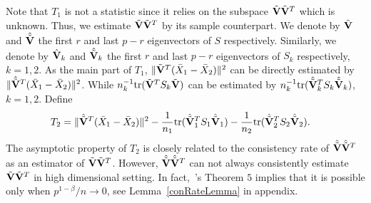 \documentclass[review]{elsarticle}
\theoremstyle{plain}
\theoremstyle{definition}
\newtheorem{remark}{\quad\quad Remark}
\theoremstyle{remark}
\begin{document}


Note that $T_1$ is not a statistic since it relies on the subspace $\tilde{\mathbf{V}}\tilde{\mathbf{V}}^T$ which is unknown. Thus, we estimate $\tilde{\mathbf{V}}\tilde{\mathbf{V}}^T$ by its sample counterpart.
We denote by $\hat{\mathbf{V}}$ and $\hat{\tilde{\mathbf{V}}}$ the first $r$ and last $p-r$ eigenvectors of $S$ respectively.
Similarly, we denote by  $\hat{\mathbf{V}}_k$ and $\hat{\tilde{\mathbf{V}}}_k$ the first $r$ and last $p-r$ eigenvectors of $S_k$ respectively, $k=1,2$.
As the main part of $T_1$, $\|\tilde{\mathbf{V}}^T (\bar{X}_1-\bar{X}_2)\|^2$
 can be directly estimated by $\|\hat{\tilde{\mathbf{V}}}^T (\bar{X}_1-\bar{X}_2)\|^2$.
While ${n_k^{-1}}\mathrm{tr}(\tilde{\mathbf{V}}^T S_k\tilde{\mathbf{V}})$ can be estimated by ${n_k^{-1}}\mathrm{tr}(\hat{\tilde{\mathbf{V}}}_k^T S_k\hat{\tilde{\mathbf{V}}}_k)$, $k=1,2$.
Define
\begin{equation*}
\begin{aligned}
    T_2&=\|\hat{\tilde{\mathbf{V}}}^T(\bar{X}_1-\bar{X}_2)\|^2-\frac{1}{n_1}\mathrm{tr}(\hat{\tilde{\mathbf{V}}}_1^T S_1\hat{\tilde{\mathbf{V}}}_1)-\frac{1}{n_2}\mathrm{tr}(\hat{\tilde{\mathbf{V}}}_2^T S_2\hat{\tilde{\mathbf{V}}}_2).
\end{aligned}
\end{equation*}
The asymptotic property of $T_2$ is closely related to the consistency rate of $\hat{\tilde{\mathbf{V}}}\hat{\tilde{\mathbf{V}}}^T$ as an estimator of $\tilde{\mathbf{V}}\tilde{\mathbf{V}}^T$.
However, $\hat{\tilde{\mathbf{V}}}\hat{\tilde{\mathbf{V}}}^T$ can not always consistently estimate $\tilde{\mathbf{V}}\tilde{\mathbf{V}}^T$ in high dimensional setting.
In fact,~\cite{Cai2012Sparse}'s Theorem $5$ implies that it is possible only when $p^{1-\beta}/n\to 0$, see Lemma~\ref{conRateLemma} in appendix.
\end{document}
